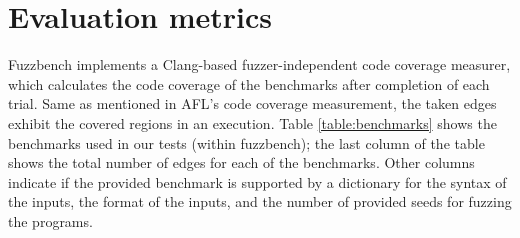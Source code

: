 \section{Evaluation metrics}
\label{sec:ch4-metrics}

Fuzzbench implements a Clang-based fuzzer-independent code coverage measurer, which calculates the code coverage of the benchmarks after completion of each trial. Same as mentioned in AFL's code coverage measurement, the taken edges exhibit the covered regions in an execution. Table \ref{table:benchmarks} shows the benchmarks used in our tests (within fuzzbench); the last column of the table shows the total number of edges for each of the benchmarks. Other columns indicate if the provided benchmark is supported by a dictionary for the syntax of the inputs, the format of the inputs, and the number of provided seeds for fuzzing the programs. 

\begin{table}[]
    \centering
    \caption{List of benchmarks used in evaluation}
    \label{table:benchmarks}
\end{table}

